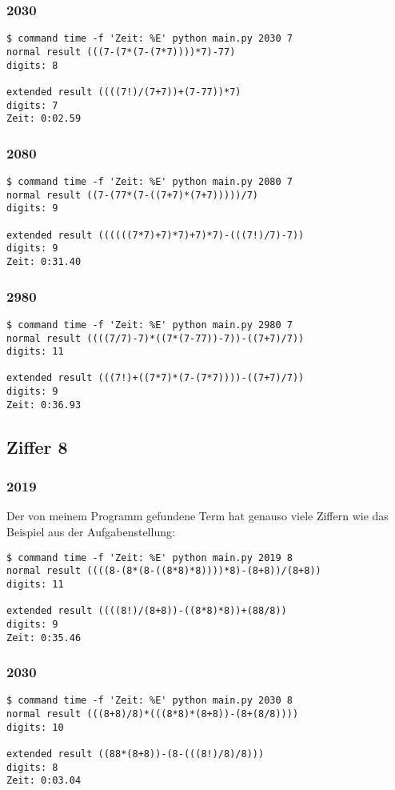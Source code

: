 \subsubsection{2030}
\begin{lstlisting}
$ command time -f 'Zeit: %E' python main.py 2030 7
normal result (((7-(7*(7-(7*7))))*7)-77)
digits: 8

extended result ((((7!)/(7+7))+(7-77))*7)
digits: 7
Zeit: 0:02.59
\end{lstlisting}
\subsubsection{2080}
\begin{lstlisting}
$ command time -f 'Zeit: %E' python main.py 2080 7
normal result ((7-(77*(7-((7+7)*(7+7)))))/7)
digits: 9

extended result ((((((7*7)+7)*7)+7)*7)-(((7!)/7)-7))
digits: 9
Zeit: 0:31.40
\end{lstlisting}
\subsubsection{2980}
\begin{lstlisting}
$ command time -f 'Zeit: %E' python main.py 2980 7
normal result ((((7/7)-7)*((7*(7-77))-7))-((7+7)/7))
digits: 11

extended result (((7!)+((7*7)*(7-(7*7))))-((7+7)/7))
digits: 9
Zeit: 0:36.93
\end{lstlisting}
\subsection{Ziffer 8}
\subsubsection{2019}
Der von meinem Programm gefundene Term hat genauso viele Ziffern wie das Beispiel aus der Aufgabenstellung:
\begin{lstlisting}
$ command time -f 'Zeit: %E' python main.py 2019 8
normal result ((((8-(8*(8-((8*8)*8))))*8)-(8+8))/(8+8))
digits: 11

extended result ((((8!)/(8+8))-((8*8)*8))+(88/8))
digits: 9
Zeit: 0:35.46
\end{lstlisting}
\subsubsection{2030}
\begin{lstlisting}
$ command time -f 'Zeit: %E' python main.py 2030 8
normal result (((8+8)/8)*(((8*8)*(8+8))-(8+(8/8))))
digits: 10

extended result ((88*(8+8))-(8-(((8!)/8)/8)))
digits: 8
Zeit: 0:03.04
\end{lstlisting}
